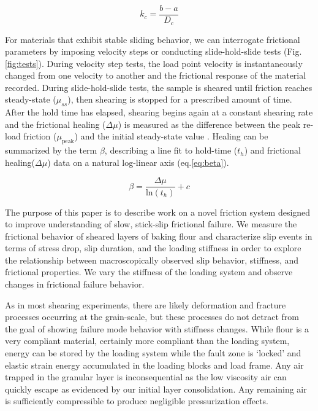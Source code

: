 \begin{equation}
    k_c = \frac{b-a}{D_c}
	\label{eq:kc}
\end{equation}


For materials that exhibit stable sliding behavior, we can interrogate
frictional parameters by imposing velocity steps or conducting slide-hold-slide
tests (Fig.\ref{fig:tests}).  During velocity step tests, the load point
velocity is instantaneously changed from one velocity to another and the
frictional response of the material recorded.  During slide-hold-slide tests,
the sample is sheared until friction reaches steady-state ($\mu_{ss}$), then
shearing is stopped for a prescribed amount of time.  After the hold time has
elapsed, shearing begins again at a constant shearing rate and the frictional
healing ($\Delta \mu$) is measured as the difference between the peak re-load
friction ($\mu_\text{peak}$) and the initial steady-state value
\cite{Marone_1998}.  Healing can be summarized by the term $\beta$, describing a
line fit to hold-time ($t_h$) and frictional healing($\Delta \mu$) data on a
natural log-linear axis (eq.\ref{eq:beta}).

\begin{equation}
    \beta = \frac{\Delta \mu}{\text{ln}(t_h)} + c
	\label{eq:beta}
\end{equation}

The purpose of this paper is to describe work on a novel friction system
designed to improve understanding of slow, stick-slip frictional failure. We
measure the frictional behavior of sheared layers of baking flour and
characterize slip events in terms of stress drop, slip duration, and the loading
stiffness in order to explore the relationship between macroscopically observed
slip behavior, stiffness, and frictional properties. We vary the stiffness of
the loading system and observe changes in frictional failure behavior.

As in most shearing experiments, there are likely deformation and fracture
processes occurring at the grain-scale, but these processes do not detract from
the goal of showing failure mode behavior with stiffness changes. While flour is
a very compliant material, certainly more compliant than the loading system,
energy can be stored by the loading system while the fault zone is `locked' and
elastic strain energy accumulated in the loading blocks and load frame. Any air
trapped in the granular layer is inconsequential as the low viscosity air can
quickly escape as evidenced by our initial layer consolidation.  Any remaining
air is sufficiently compressible to produce negligible pressurization effects.

